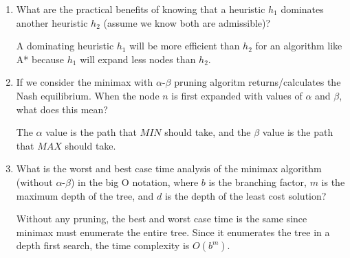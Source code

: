 \documentclass[12pt,letterpaper]{article}
\begin{document}
\begin{enumerate}
\begin{proof}
        If we decide to `relax' the rule for this problem we can get rid of the two restrictions that ``the two positions must be adjacent'' and ``the new position must be blank''.
        By removing these two restrictions, we get our ``number of misplaced tiles'' heuristic.

        We can show this is admissible by induction.

        In the base case, no tiles are out of place, so the heuristic gives the optimal cost of 0 (which is not an overestimation).

        For the inductive case, if $n$ tiles are out of place, then at least $n$ moves must be performed in order to reach the goal state.
        Again, this is not an overestimation.

        Thus, this heuristic is admissible.
      \end{proof}

    \item What are the practical benefits of knowing that a heuristic $h_1$ dominates another heuristic $h_2$ (assume we know both are admissible)?

      A dominating heuristic $h_1$ will be more efficient than $h_2$ for an algorithm like A*
      because $h_1$ will expand less nodes than $h_2$.

    \item
      If we consider the minimax with $\alpha$-$\beta$ pruning algoritm returns/calculates the Nash equilibrium.
      When the node $n$ is first expanded with values of $\alpha$ and $\beta$, what does this mean?

      The $\alpha$ value is the path that $MIN$ should take,
      and the $\beta$ value is the path that $MAX$ should take.

    \item
      What is the worst and best case time analysis of the minimax algorithm (without $\alpha$-$\beta$) in the big O notation, where $b$ is the branching factor, $m$ is the maximum depth of the tree, and $d$ is the depth of the least cost solution?

      Without any pruning, the best and worst case time is the same since minimax must enumerate the entire tree.
      Since it enumerates the tree in a depth first search, the time complexity is $O(b^m)$.
  \end{enumerate}
\end{document}
